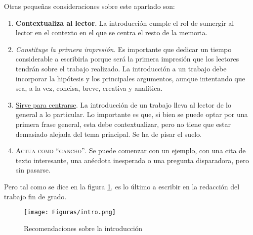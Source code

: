 Otras pequeñas consideraciones sobre este apartado son:
\begin{enumerate}
    \item  \textbf{Contextualiza al lector}. La introducción cumple el rol de sumergir al lector en el contexto en el que se  centra el resto de la memoria.
    \item  \textit{Constituye la primera impresión}. Es importante que dedicar un tiempo considerable a escribirla porque será la primera impresión que los lectores tendrán sobre el trabajo realizado. La introducción a un trabajo debe incorporar la hipótesis y los principales argumentos, aunque intentando que sea, a la vez, concisa, breve, creativa y analítica.

\item \underline{ Sirve para centrarse}. La introducción de un trabajo lleva al lector de lo general a lo particular. Lo importante es que, si bien se puede optar por una primera frase general, esta debe contextualizar, pero no tiene que estar demasiado alejada del tema principal. Se ha de pisar el suelo.

\item \textsc{Actúa como “gancho”}.  Se puede comenzar con un ejemplo, con una cita de texto interesante, una anécdota inesperada o una pregunta disparadora, pero sin pasarse.
    
\end{enumerate}


Pero  tal como se dice en la figura \ref{fig:recintro}, es lo último a escribir en la redacción del  trabajo fin de grado.


\begin{figure}
	\begin{center}
		\texttt{[image: Figuras/intro.png]}
	\end{center}
	\caption{\label{fig:recintro} Recomendaciones sobre la introducción}
\end{figure}



